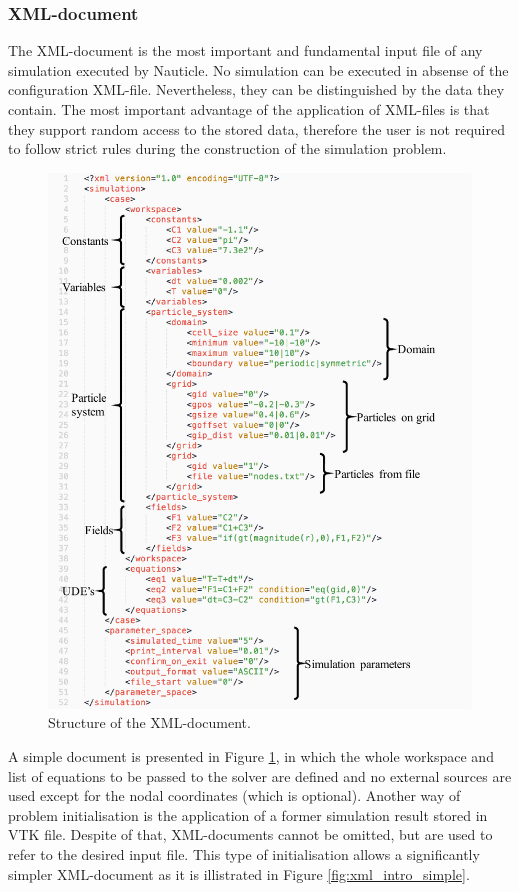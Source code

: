 \documentclass[a4paper,12pt,openany]{book}
\theoremstyle{break}
\begin{document}
\subsubsection{XML-document} \label{sec:XML}
The XML-document is the most important and fundamental input file of any simulation executed by Nauticle. No simulation can be executed in absense of the configuration XML-file. Nevertheless, they can be distinguished by the data they contain. The most important advantage of the application of XML-files is that they support random access to the stored data, therefore the user is not required to follow strict rules during the construction of the simulation problem.
\begin{figure}[h!]
  \includegraphics[scale=1.05]{xml_intro.pdf}
  \centering
  \caption{Structure of the XML-document.}
  \label{fig:xml_intro}
\end{figure}\vspace*{3pt}
A simple document is presented in Figure \ref{fig:xml_intro}, in which the whole workspace and list of equations to be passed to the solver are defined and no external sources are used except for the nodal coordinates (which is optional). Another way of problem initialisation is the application of a former simulation result stored in VTK file. Despite of that, XML-documents cannot be omitted, but are used to refer to the desired input file. This type of initialisation allows a significantly simpler XML-document as it is illistrated in Figure \ref{fig:xml_intro_simple}.
\end{document}
